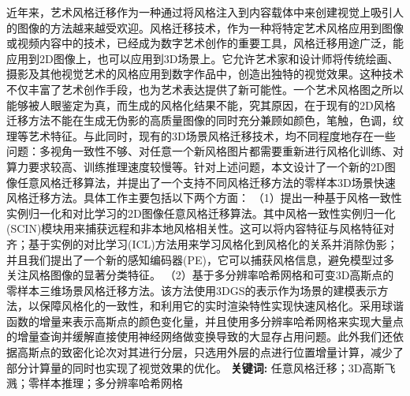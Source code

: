 \cleardoublepage
{}

\setlength{\parindent}{2em} 
近年来，艺术风格迁移作为一种通过将风格注入到内容载体中来创建视觉上吸引人的图像的方法越来越受欢迎。风格迁移技术，作为一种将特定艺术风格应用到图像或视频内容中的技术，已经成为数字艺术创作的重要工具，风格迁移用途广泛，能应用到2D图像上，也可以应用到3D场景上。它允许艺术家和设计师将传统绘画、摄影及其他视觉艺术的风格应用到数字作品中，创造出独特的视觉效果。这种技术不仅丰富了艺术创作手段，也为艺术表达提供了新可能性。一个艺术风格图之所以能够被人眼鉴定为真，而生成的风格化结果不能，究其原因，在于现有的2D风格迁移方法不能在生成无伪影的高质量图像的同时充分兼顾如颜色，笔触，色调，纹理等艺术特征。与此同时，现有的3D场景风格迁移技术，均不同程度地存在一些问题：多视角一致性不够、对任意一个新风格图片都需要重新进行风格化训练、对算力要求较高、训练推理速度较慢等。针对上述问题，本文设计了一个新的2D图像任意风格迁移算法，并提出了一个支持不同风格迁移方法的零样本3D场景快速风格迁移方法。具体工作主要包括以下两个方面：
\newline \indent（1）提出一种基于风格一致性实例归一化和对比学习的2D图像任意风格迁移算法。其中风格一致性实例归一化 (SCIN)模块用来捕获远程和非本地风格相关性。这可以将内容特征与风格特征对齐；基于实例的对比学习(ICL)方法用来学习风格化到风格化的关系并消除伪影；并且我们提出了一个新的感知编码器(PE)，它可以捕获风格信息，避免模型过多关注风格图像的显著分类特征。   
\newline \indent（2）基于多分辨率哈希网格和可变3D高斯点的零样本三维场景风格迁移方法。该方法使用3DGS的表示作为场景的建模表示方法，以保障风格化的一致性，和利用它的实时渲染特性实现快速风格化。采用球谐函数的增量来表示高斯点的颜色变化量，并且使用多分辨率哈希网格来实现大量点的增量查询并缓解直接使用神经网络做变换导致的大显存占用问题。此外我们还依据高斯点的致密化论次对其进行分层，只选用外层的点进行位置增量计算，减少了部分计算量的同时也实现了视觉效果的优化。
\newline
{\textbf{关键词:}}
任意风格迁移；3D高斯飞溅；零样本推理；多分辨率哈希网格

